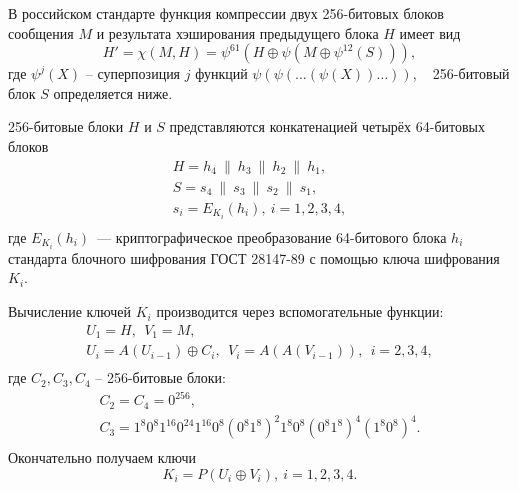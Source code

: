 В российском стандарте функция компрессии двух 256-битовых блоков сообщения $M$ и результата хэширования предыдущего блока $H$ имеет вид
\[
    H' = \chi(M, H) = \psi^{61}(H \oplus \psi(M \oplus \psi^{12}(S))),
\]
где $\psi^j(X)$ -- суперпозиция $j$ функций $\psi( \psi( \dots ( \psi( X)) \dots ))$, ~ 256-битовый блок $S$ определяется ниже.

256-битовые блоки $H$ и $S$ представляются конкатенацией четырёх 64-битовых блоков
\[ \begin{array}{l}
    H = h_4 ~\|~ h_3 ~\|~ h_2 ~\|~ h_1, \\
    S = s_4 ~\|~ s_3 ~\|~ s_2 ~\|~ s_1, \\
    s_i = E_{K_i}( h_i), ~ i = 1, 2, 3, 4, \\
\end{array} \]
где $E_{K_i}( h_i)$~--- криптографическое преобразование 64-битового блока $h_i$ стандарта блочного шифрования ГОСТ 28147-89 с помощью ключа шифрования $K_i$.

Вычисление ключей $K_i$ производится через вспомогательные функции:
\[ \begin{array}{c}
    U_1 = H, ~~ V_1 = M, \\
    U_i = A(U_{i-1}) \oplus C_i, ~~ V_i = A(A(V_{i-1})), ~~ i = 2, 3, 4, \\
\end{array} \]
где $C_2, C_3, C_4$ -- 256-битовые блоки:
\[ \begin{array}{c}
    C_2 = C_4 = 0^{256}, \\
    C_3 = 1^8 0^8 1^{16} 0^{24} 1^{16} 0^8 (0^8 1^8)^2 1^8 0^8 (0^8 1^8)^4 (1^8 0^8)^4. \\
\end{array} \]
Окончательно получаем ключи
\[
    K_i = P(U_i \oplus V_i), ~ i = 1,2,3,4.
\]

